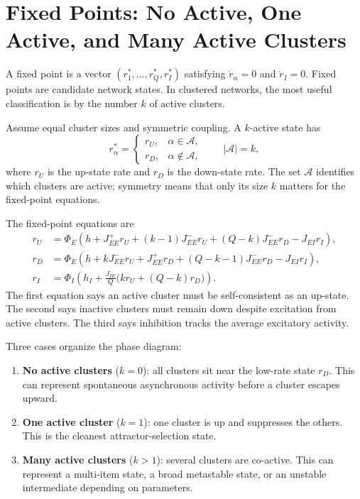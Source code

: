 \section{Fixed Points: No Active, One Active, and Many Active Clusters}
\label{sec:fixed-points-cluster-count}

A fixed point is a vector $(r_1^*,\ldots,r_Q^*,r_I^*)$ satisfying $\dot r_{\alpha}=0$ and $\dot r_I=0$. Fixed points are candidate network states. In clustered networks, the most useful classification is by the number $k$ of active clusters.

Assume equal cluster sizes and symmetric coupling. A $k$-active state has
%
\begin{equation}
  r_{\alpha}^*
  =
  \begin{cases}
    r_U, & \alpha \in \mathcal{A},\\
    r_D, & \alpha \notin \mathcal{A},
  \end{cases}
  \qquad
  |\mathcal{A}|=k ,
  \label{eq:k-active-ansatz}
\end{equation}
%
where $r_U$ is the up-state rate and $r_D$ is the down-state rate. The set $\mathcal{A}$ identifies which clusters are active; symmetry means that only its size $k$ matters for the fixed-point equations.

The fixed-point equations are
%
\begin{align}
  r_U
  &=
  \Phi_E\!\left(
    h
    +
    J_{EE}^{+}r_U
    +
    (k-1)J_{EE}^{-}r_U
    +
    (Q-k)J_{EE}^{-}r_D
    -
    J_{EI}r_I
  \right),
  \label{eq:k-active-up}\\
  r_D
  &=
  \Phi_E\!\left(
    h
    +
    kJ_{EE}^{-}r_U
    +
    J_{EE}^{+}r_D
    +
    (Q-k-1)J_{EE}^{-}r_D
    -
    J_{EI}r_I
  \right),
  \label{eq:k-active-down}\\
  r_I
  &=
  \Phi_I\!\left(
    h_I + \frac{J_{IE}}{Q}\bigl(kr_U+(Q-k)r_D\bigr)
  \right).
  \label{eq:k-active-inhibition}
\end{align}
%
The first equation says an active cluster must be self-consistent as an up-state. The second says inactive clusters must remain down despite excitation from active clusters. The third says inhibition tracks the average excitatory activity.

Three cases organize the phase diagram:
%
\begin{enumerate}[leftmargin=*]
  \item \textbf{No active clusters} ($k=0$): all clusters sit near the low-rate state $r_D$. This can represent spontaneous asynchronous activity before a cluster escapes upward.
  \item \textbf{One active cluster} ($k=1$): one cluster is up and suppresses the others. This is the cleanest attractor-selection state.
  \item \textbf{Many active clusters} ($k>1$): several clusters are co-active. This can represent a multi-item state, a broad metastable state, or an unstable intermediate depending on parameters.
\end{enumerate}

